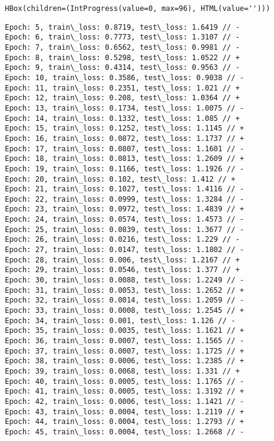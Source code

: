 \documentclass[11pt]{article}
\begin{document}
    
    \begin{verbatim}
HBox(children=(IntProgress(value=0, max=96), HTML(value='')))
    \end{verbatim}

    
    \begin{Verbatim}[commandchars=\\\{\}]
Epoch: 5, train\_loss: 0.8719, test\_loss: 1.6419 // -
Epoch: 6, train\_loss: 0.7773, test\_loss: 1.3107 // -
Epoch: 7, train\_loss: 0.6562, test\_loss: 0.9981 // -
Epoch: 8, train\_loss: 0.5298, test\_loss: 1.0522 // +
Epoch: 9, train\_loss: 0.4314, test\_loss: 0.9563 // -
Epoch: 10, train\_loss: 0.3586, test\_loss: 0.9038 // -
Epoch: 11, train\_loss: 0.2351, test\_loss: 1.021 // +
Epoch: 12, train\_loss: 0.208, test\_loss: 1.0364 // +
Epoch: 13, train\_loss: 0.1734, test\_loss: 1.0075 // -
Epoch: 14, train\_loss: 0.1332, test\_loss: 1.085 // +
Epoch: 15, train\_loss: 0.1252, test\_loss: 1.1145 // +
Epoch: 16, train\_loss: 0.0872, test\_loss: 1.1737 // +
Epoch: 17, train\_loss: 0.0807, test\_loss: 1.1601 // -
Epoch: 18, train\_loss: 0.0813, test\_loss: 1.2609 // +
Epoch: 19, train\_loss: 0.1166, test\_loss: 1.1926 // -
Epoch: 20, train\_loss: 0.102, test\_loss: 1.412 // +
Epoch: 21, train\_loss: 0.1027, test\_loss: 1.4116 // -
Epoch: 22, train\_loss: 0.0999, test\_loss: 1.3284 // -
Epoch: 23, train\_loss: 0.0972, test\_loss: 1.4839 // +
Epoch: 24, train\_loss: 0.0574, test\_loss: 1.4573 // -
Epoch: 25, train\_loss: 0.0839, test\_loss: 1.3677 // -
Epoch: 26, train\_loss: 0.0216, test\_loss: 1.229 // -
Epoch: 27, train\_loss: 0.0147, test\_loss: 1.1802 // -
Epoch: 28, train\_loss: 0.006, test\_loss: 1.2167 // +
Epoch: 29, train\_loss: 0.0546, test\_loss: 1.377 // +
Epoch: 30, train\_loss: 0.0088, test\_loss: 1.2249 // -
Epoch: 31, train\_loss: 0.0053, test\_loss: 1.2652 // +
Epoch: 32, train\_loss: 0.0014, test\_loss: 1.2059 // -
Epoch: 33, train\_loss: 0.0008, test\_loss: 1.2545 // +
Epoch: 34, train\_loss: 0.001, test\_loss: 1.126 // -
Epoch: 35, train\_loss: 0.0035, test\_loss: 1.1621 // +
Epoch: 36, train\_loss: 0.0007, test\_loss: 1.1565 // -
Epoch: 37, train\_loss: 0.0007, test\_loss: 1.1725 // +
Epoch: 38, train\_loss: 0.0006, test\_loss: 1.2385 // +
Epoch: 39, train\_loss: 0.0068, test\_loss: 1.331 // +
Epoch: 40, train\_loss: 0.0005, test\_loss: 1.1765 // -
Epoch: 41, train\_loss: 0.0005, test\_loss: 1.3192 // +
Epoch: 42, train\_loss: 0.0006, test\_loss: 1.1421 // -
Epoch: 43, train\_loss: 0.0004, test\_loss: 1.2119 // +
Epoch: 44, train\_loss: 0.0004, test\_loss: 1.2793 // +
Epoch: 45, train\_loss: 0.0004, test\_loss: 1.2668 // -

\end{Verbatim}
\end{document}
